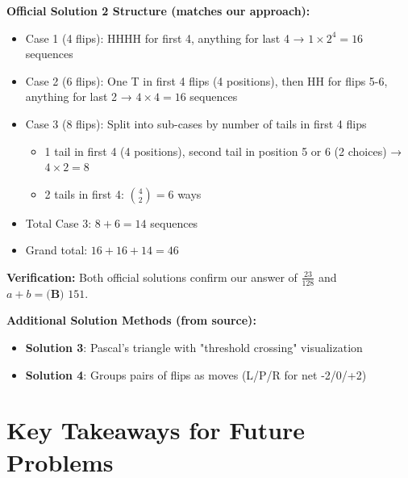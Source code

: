 \documentclass[]{article}
\begin{document}
\textbf{Official Solution 2 Structure (matches our approach):}
\begin{itemize}
    \item Case 1 (4 flips): HHHH for first 4, anything for last 4 → $1 \times 2^4 = 16$ sequences
    \item Case 2 (6 flips): One T in first 4 flips (4 positions), then HH for flips 5-6, anything for last 2 → $4 \times 4 = 16$ sequences
    \item Case 3 (8 flips): Split into sub-cases by number of tails in first 4 flips
    \begin{itemize}
        \item 1 tail in first 4 (4 positions), second tail in position 5 or 6 (2 choices) → $4 \times 2 = 8$
        \item 2 tails in first 4: $\binom{4}{2} = 6$ ways
    \end{itemize}
    \item Total Case 3: $8 + 6 = 14$ sequences
    \item Grand total: $16 + 16 + 14 = 46$
\end{itemize}

\textbf{Verification:} Both official solutions confirm our answer of $\frac{23}{128}$ and $a+b = \boxed{\textbf{(B) }151}$.

\textbf{Additional Solution Methods (from source):}
\begin{itemize}
    \item \textbf{Solution 3}: Pascal's triangle with "threshold crossing" visualization
    \item \textbf{Solution 4}: Groups pairs of flips as moves (L/P/R for net -2/0/+2)
\end{itemize}

\section*{Key Takeaways for Future Problems}
\end{document}
